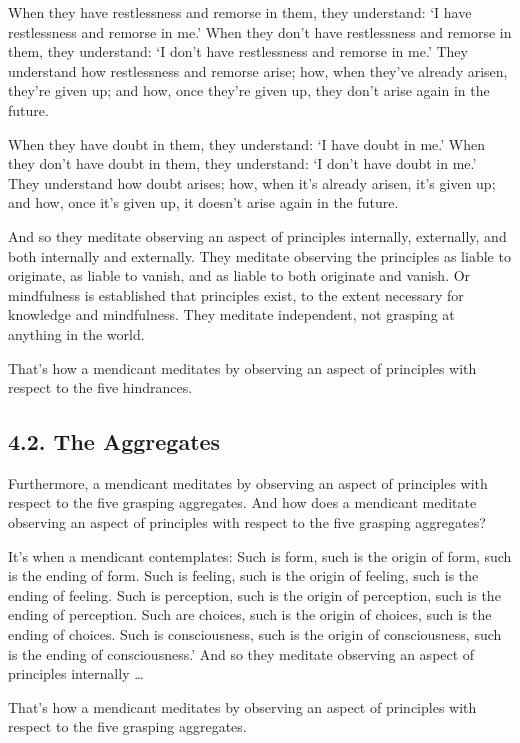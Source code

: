 \documentclass[12pt,openany]{book}%
\begin{document}
When they have restlessness and remorse in them, they understand: ‘I have restlessness and remorse in me.’ When they don’t have restlessness and remorse in them, they understand: ‘I don’t have restlessness and remorse in me.’ They understand how restlessness and remorse arise; how, when they’ve already arisen, they’re given up; and how, once they’re given up, they don’t arise again in the future. 

When they have doubt in them, they understand: ‘I have doubt in me.’ When they don’t have doubt in them, they understand: ‘I don’t have doubt in me.’ They understand how doubt arises; how, when it’s already arisen, it’s given up; and how, once it’s given up, it doesn’t arise again in the future. 

And so they meditate observing an aspect of principles internally, externally, and both internally and externally. They meditate observing the principles as liable to originate, as liable to vanish, and as liable to both originate and vanish. Or mindfulness is established that principles exist, to the extent necessary for knowledge and mindfulness. They meditate independent, not grasping at anything in the world. 

That’s how a mendicant meditates by observing an aspect of principles with respect to the five hindrances. 

\subsection*{4.2. The Aggregates }

Furthermore, a mendicant meditates by observing an aspect of principles with respect to the five grasping aggregates. And how does a mendicant meditate observing an aspect of principles with respect to the five grasping aggregates? 

It’s when a mendicant contemplates: Such is form, such is the origin of form, such is the ending of form. Such is feeling, such is the origin of feeling, such is the ending of feeling. Such is perception, such is the origin of perception, such is the ending of perception. Such are choices, such is the origin of choices, such is the ending of choices. Such is consciousness, such is the origin of consciousness, such is the ending of consciousness.’ And so they meditate observing an aspect of principles internally … 

That’s how a mendicant meditates by observing an aspect of principles with respect to the five grasping aggregates. 
\end{document}
